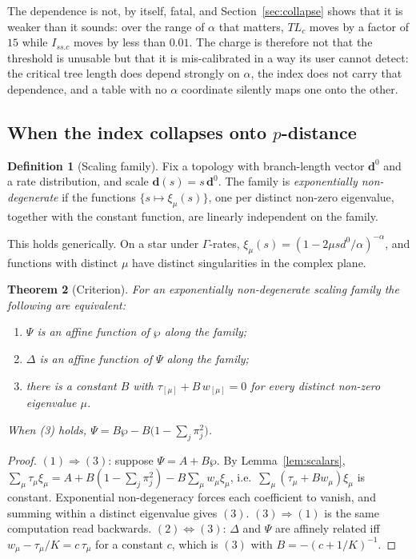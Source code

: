 \documentclass[preprint,12pt,authoryear]{elsarticle}
\newcommand{\Issc}{I_{ss.c}}
\newtheorem{theorem}{Theorem}
\theoremstyle{definition}
\newtheorem{definition}[theorem]{Definition}
\theoremstyle{remark}
\begin{document}
The dependence is not, by itself, fatal, and Section~\ref{sec:collapse} shows
that it is weaker than it sounds: over the range of $\alpha$ that matters,
$TL_c$ moves by a factor of $15$ while $\Issc$ moves by less than $0.01$. The
charge is therefore not that the threshold is unusable but that it is
mis-calibrated in a way its user cannot detect: the critical tree length does
depend strongly on $\alpha$, the index does not carry that dependence, and a
table with no $\alpha$ coordinate silently maps one onto the other.

\subsection{When the index collapses onto \texorpdfstring{$p$}{p}-distance}
\label{sec:criterion}

\begin{definition}[Scaling family]
Fix a topology with branch-length vector $\mathbf d^0$ and a rate
distribution, and scale $\mathbf d(s)=s\,\mathbf d^0$. The family is
\emph{exponentially non-degenerate} if the functions
$\{s\mapsto\xi_\mu(s)\}$, one per distinct non-zero eigenvalue, together with
the constant function, are linearly independent on the family.
\end{definition}

This holds generically. On a star under $\Gamma$-rates,
$\xi_\mu(s)=(1-2\mu s d^0/\alpha)^{-\alpha}$, and functions with distinct
$\mu$ have distinct singularities in the complex plane.

\begin{theorem}[Criterion]
\label{thm:affine}
For an exponentially non-degenerate scaling family the following are
equivalent:
\begin{enumerate}
\item $\Psi$ is an affine function of $\wp$ along the family;
\item $\Delta$ is an affine function of $\Psi$ along the family;
\item there is a constant $B$ with $\tau_{[\mu]}+B\,w_{[\mu]}=0$ for every
      distinct non-zero eigenvalue $\mu$.
\end{enumerate}
When (3) holds, $\Psi=B\wp-B\bigl(1-\sum_j\pi_j^2\bigr)$.
\end{theorem}

\begin{proof}
$(1)\Rightarrow(3)$: suppose $\Psi=A+B\wp$. By Lemma~\ref{lem:scalars},
$\sum_\mu\tau_\mu\xi_\mu=A+B(1-\sum_j\pi_j^2)-B\sum_\mu w_\mu\xi_\mu$, i.e.\
$\sum_\mu(\tau_\mu+Bw_\mu)\xi_\mu$ is constant. Exponential non-degeneracy
forces each coefficient to vanish, and summing within a distinct eigenvalue
gives $(3)$. $(3)\Rightarrow(1)$ is the same computation read backwards.
$(2)\Leftrightarrow(3)$: $\Delta$ and $\Psi$ are affinely related iff
$w_\mu-\tau_\mu/K=c\,\tau_\mu$ for a constant $c$, which is $(3)$ with
$B=-(c+1/K)^{-1}$.
\end{proof}
\end{document}
